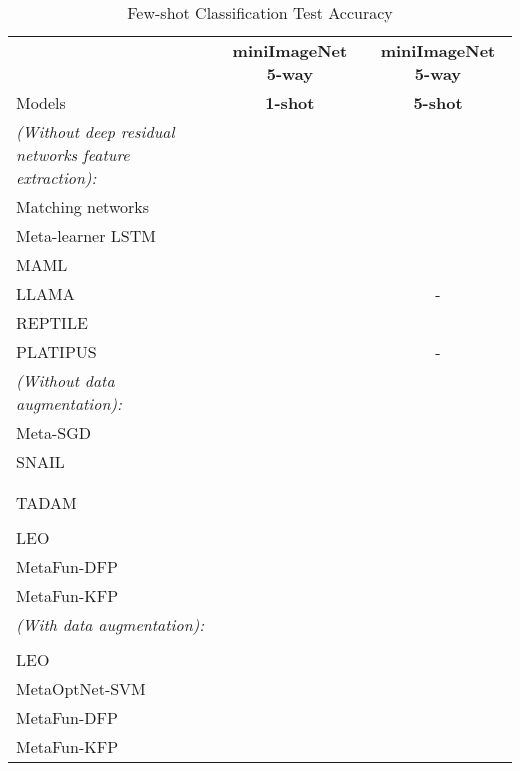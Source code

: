 \documentclass{article}
\theoremstyle{definition}
\begin{document}
\begin{table*}[!htb]  
  \centering
  \footnotesize
  \begin{threeparttable}[]
  \caption{Few-shot Classification Test Accuracy}
  \begin{tabular}{l|cc}
    \toprule
         & \textbf{miniImageNet 5-way}     & \textbf{miniImageNet 5-way}  \\
    Models    & \textbf{1-shot}     & \textbf{5-shot} \\
    \midrule
    \emph{(Without deep residual networks feature extraction):} & & \\
    Matching networks \citep{vinyals2016matching} &  &  \\
    Meta-learner LSTM \citep{ravi2016optimization}  &  &  \\
    MAML \citep{finn2017model} &  &  \\
    LLAMA \citep{grant2018recasting}  &  & - \\
    REPTILE \citep{nichol2018first}  &  &  \\
    PLATIPUS \citep{finn2018probabilistic}  &  & - \\
    \midrule
    \emph{(Without data augmentation):} & & \\
    Meta-SGD \citep{li2017meta} &  &   \\
    SNAIL \citep{mishra2017simple} &  &  \\
    \citet{bauer2017discriminative} &  &  \\
    \citet{munkhdalai2018rapid} &  &  \\
    TADAM \citep{oreshkin2018tadam} &  &   \\
    \citet{qiao2018few} &  &   \\
    LEO &  &   \\
MetaFun-DFP &  &   \\
    MetaFun-KFP &  &   \\
    
    
    \midrule
    \emph{(With data augmentation):} & & \\
    \citet{qiao2018few} &  &   \\
    LEO &  &   \\
    MetaOptNet-SVM \citep{lee2019meta}\tnote{1} &  &   \\
    MetaFun-DFP &   & 
      \\
    MetaFun-KFP &   & 
      \\
\bottomrule
  \end{tabular}
  

\end{threeparttable}
\end{table*}
\end{document}
